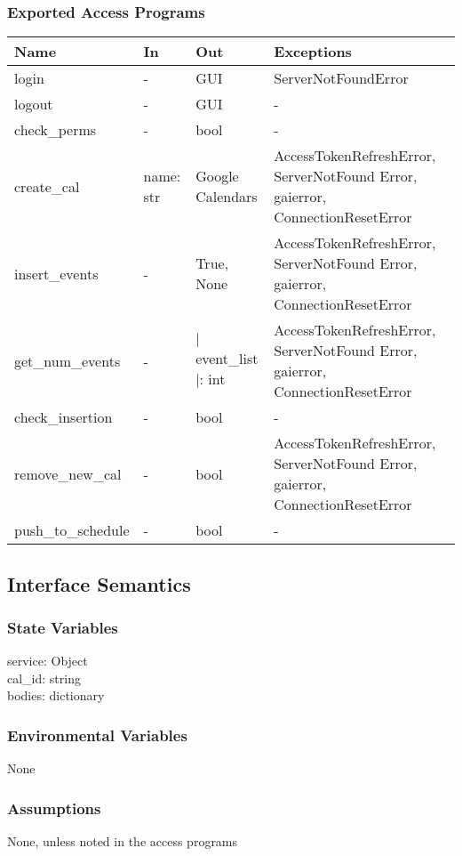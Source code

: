 \documentclass[12pt, titlepage]{article}
\begin{document}
\subsubsection{Exported Access Programs}
\begin{tabular}[pos]{|p{3cm}|p{1cm}|p{2cm}|p{10cm}|}
	\hline
	\textbf{Name}& \textbf{In} & \textbf{Out} & \textbf{Exceptions} \\ \hline
	login & - & GUI & ServerNotFoundError\\ \hline
	logout & - & GUI & -\\ \hline 
	check\_perms & - & bool & -\\ \hline
	create\_cal & name: str & Google Calendars & AccessTokenRefreshError, ServerNotFound Error, gaierror, ConnectionResetError \\ \hline
	insert\_events & - & True, None & AccessTokenRefreshError, ServerNotFound Error, gaierror, ConnectionResetError\\ \hline
	get\_num\_events & - & $|$event\_list$|$: int & AccessTokenRefreshError, ServerNotFound Error, gaierror, ConnectionResetError \\ \hline
	check\_insertion & - & bool & - \\ \hline
	remove\_new\_cal & - & bool & AccessTokenRefreshError, ServerNotFound Error, gaierror, ConnectionResetError\\ \hline
	push\_to\_schedule & - & bool & -\\ \hline
	
\end{tabular}

\subsection{Interface Semantics}
\subsubsection{State Variables}
service: Object\\
cal\_id: string \\
bodies: dictionary \\
\subsubsection{Environmental Variables}
None
\subsubsection{Assumptions}
None, unless noted in the access programs
\end{document}
